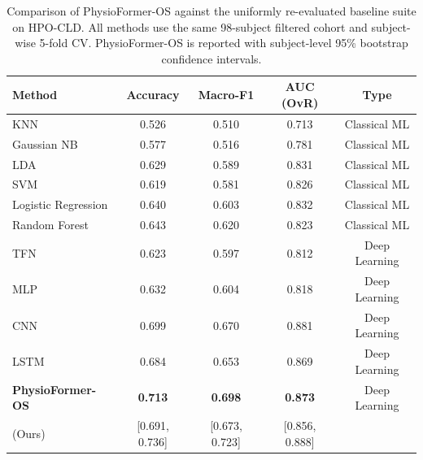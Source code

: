 \begin{table}[htbp]
\centering
\caption{Comparison of PhysioFormer-OS against the uniformly re-evaluated baseline suite on HPO-CLD. All methods use the same 98-subject filtered cohort and subject-wise 5-fold CV. PhysioFormer-OS is reported with subject-level 95\% bootstrap confidence intervals.}
\label{tab:main_results}
\begin{tabular}{lcccc}
\toprule
Method & Accuracy & Macro-F1 & AUC (OvR) & Type \\
\midrule
KNN & 0.526 & 0.510 & 0.713 & Classical ML \\
Gaussian NB & 0.577 & 0.516 & 0.781 & Classical ML \\
LDA & 0.629 & 0.589 & 0.831 & Classical ML \\
SVM & 0.619 & 0.581 & 0.826 & Classical ML \\
Logistic Regression & 0.640 & 0.603 & 0.832 & Classical ML \\
Random Forest & 0.643 & 0.620 & 0.823 & Classical ML \\
TFN & 0.623 & 0.597 & 0.812 & Deep Learning \\
MLP & 0.632 & 0.604 & 0.818 & Deep Learning \\
CNN & 0.699 & 0.670 & 0.881 & Deep Learning \\
LSTM & 0.684 & 0.653 & 0.869 & Deep Learning \\
\textbf{PhysioFormer-OS} & \textbf{0.713} & \textbf{0.698} & \textbf{0.873} & Deep Learning \\
(Ours) & [0.691, 0.736] & [0.673, 0.723] & [0.856, 0.888] & \\
\bottomrule
\end{tabular}
\end{table}
